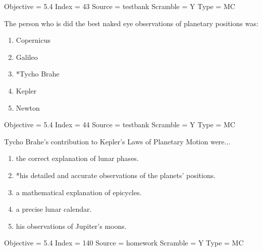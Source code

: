 \documentclass[11pt]{article}
\begin{document}
\begin{enumerate}
\begin{minipage}{\textwidth}
\begin{minipage}{\textwidth}
Objective = 5.4
Index = 43
Source = testbank
Scramble = Y
Type = MC
\end{minipage}
\end{minipage}
\vskip 0.20in

\begin{minipage}{\textwidth}
\begin{minipage}{\textwidth}
\item The person who is did the best naked eye observations of planetary positions was:
\begin{multicols}{3}
\begin{enumerate} 
\setlength{\itemsep}{1pt} 
\setlength{\parskip}{0pt} 
\setlength{\parsep}{0pt}
\setlength{\multicolsep}{1pt} 
\item Copernicus
\item Galileo
\item *Tycho Brahe
\item Kepler
\item Newton
\end{enumerate} 
\vfill 
\end{multicols}

Objective = 5.4
Index = 44
Source = testbank
Scramble = Y
Type = MC
\end{minipage}
\end{minipage}
\vskip 0.20in

\begin{minipage}{\textwidth}
\begin{minipage}{\textwidth}
\item Tycho Brahe's contribution to Kepler's Laws of Planetary Motion were...
\begin{enumerate} 
\setlength{\itemsep}{1pt} 
\setlength{\parskip}{0pt} 
\setlength{\parsep}{0pt}
\setlength{\multicolsep}{1pt} 
\item the correct explanation of lunar phases.
\item *his detailed and accurate observations of the planets' positions.
\item a mathematical explanation of epicycles.
\item a precise lunar calendar.
\item his observations of Jupiter's moons.
\end{enumerate} 
Objective = 5.4
Index = 140
Source = homework
Scramble = Y
Type = MC
\end{minipage}
\end{minipage}
\vskip 0.20in


\end{enumerate}
\end{document}

